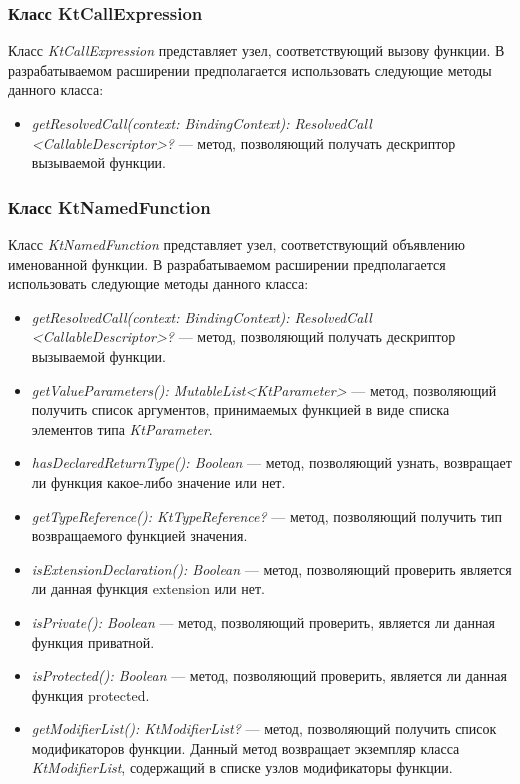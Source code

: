 \subsubsection{Класс KtCallExpression}
\label{ssub:kt_call_expression_description}
Класс \textit{KtCallExpression} представляет узел, соответствующий вызову
функции.
В разрабатываемом расширении предполагается использовать следующие методы
данного класса:
\begin{itemize}
	\item \textit{getResolvedCall(context: BindingContext): ResolvedCall
		<CallableDescriptor>?} --- метод, позволяющий получать дескриптор
		вызываемой функции.
\end{itemize}
\subsubsection{Класс KtNamedFunction}
\label{ssub:kt_named_function_description}
Класс \textit{KtNamedFunction} представляет узел, соответствующий объявлению
именованной функции.
В разрабатываемом расширении предполагается использовать следующие методы
данного класса:
\begin{itemize}
	\item \textit{getResolvedCall(context: BindingContext): ResolvedCall
		<CallableDescriptor>?} --- метод, позволяющий получать дескриптор
		вызываемой функции.
	\item \textit{getValueParameters(): MutableList<KtParameter>} --- метод,
		позволяющий получить список аргументов, принимаемых функцией в виде
		списка элементов типа \textit{KtParameter}.
	\item \textit{hasDeclaredReturnType(): Boolean} --- метод, позволяющий
		узнать, возвращает ли функция какое-либо значение или нет.
	\item \textit{getTypeReference(): KtTypeReference?} --- метод, позволяющий
		получить тип возвращаемого функцией значения.
	\item \textit{isExtensionDeclaration(): Boolean} --- метод, позволяющий
		проверить является ли данная функция extension или нет.
	\item \textit{isPrivate(): Boolean} --- метод, позволяющий проверить,
		является ли данная функция приватной.
	\item \textit{isProtected(): Boolean} --- метод, позволяющий проверить,
		является ли данная функция protected.
	\item \textit{getModifierList(): KtModifierList?} --- метод, позволяющий
		получить список модификаторов функции.
		Данный метод возвращает экземпляр класса \textit{KtModifierList}, содержащий
		в списке узлов модификаторы функции.
\end{itemize}
